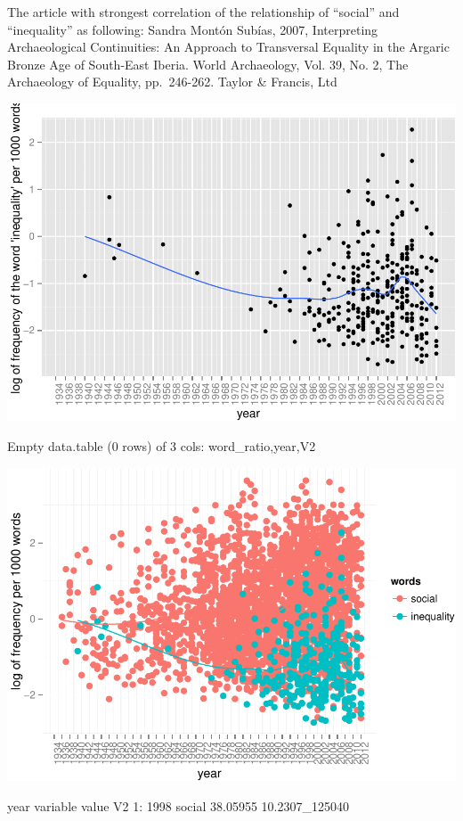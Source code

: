 \documentclass[10pt]{article}
\newenvironment{CodeChunk}{}{}
\begin{document}
The article with strongest correlation of the relationship of ``social''
and ``inequality'' as following: Sandra Montón Subías, 2007,
Interpreting Archaeological Continuities: An Approach to Transversal
Equality in the Argaric Bronze Age of South-East Iberia. World
Archaeology, Vol. 39, No. 2, The Archaeology of Equality, pp.~246-262.
Taylor \& Francis, Ltd

\begin{CodeChunk}

\includegraphics{509Assignment_files/figure-latex/onegram-1} \begin{CodeOutput}
Empty data.table (0 rows) of 3 cols: word_ratio,year,V2
\end{CodeOutput}

\includegraphics{509Assignment_files/figure-latex/onegram-2} \begin{CodeOutput}
   year variable    value             V2
1: 1998   social 38.05955 10.2307_125040
\end{CodeOutput}


\end{CodeChunk}
\end{document}

